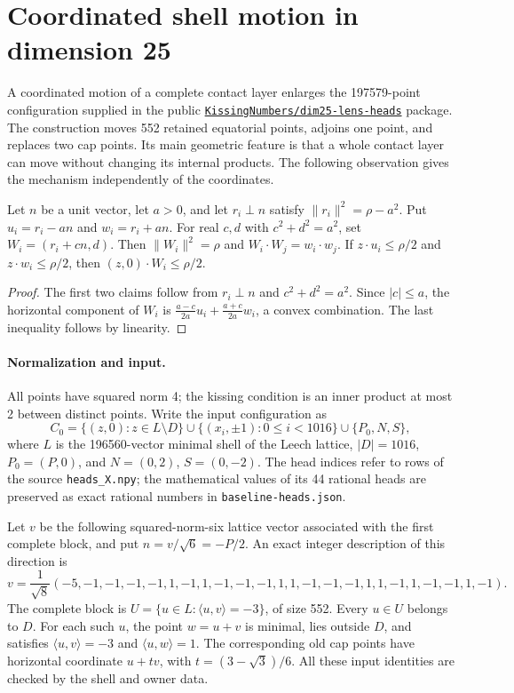 \section{Coordinated shell motion in dimension 25}\label{sec:motion25}
\providecommand{\ip}[2]{\langle #1,#2\rangle}

\noindent
A coordinated motion of a complete contact layer enlarges the 197579-point
configuration supplied in the public
\href{https://github.com/alexlegeartis/KissingNumbers/tree/cf14c5ef4db6059bbf2e570e3f0ce24edfda243e/verifications/improved/dim25-lens-heads}
{\texttt{KissingNumbers/dim25-lens-heads}} package.
The construction moves 552 retained equatorial points, adjoins one point,
and replaces two cap points. Its main geometric feature is that a whole
contact layer can move without changing its internal products. The
following observation gives the mechanism independently of the coordinates.

\begin{lemma}\label{lem:chord-motion}
Let $n$ be a unit vector, let $a>0$, and let $r_i\perp n$ satisfy
$\|r_i\|^2=\rho-a^2$. Put $u_i=r_i-an$ and $w_i=r_i+an$.
For real $c,d$ with $c^2+d^2=a^2$, set $W_i=(r_i+cn,d)$.
Then $\|W_i\|^2=\rho$ and $W_i\cdot W_j=w_i\cdot w_j$.
If $z\cdot u_i\le\rho/2$ and $z\cdot w_i\le\rho/2$, then
$(z,0)\cdot W_i\le\rho/2$.
\end{lemma}
\begin{proof}
The first two claims follow from $r_i\perp n$ and $c^2+d^2=a^2$.
Since $|c|\le a$, the horizontal component of $W_i$ is
$\frac{a-c}{2a}u_i+\frac{a+c}{2a}w_i$, a convex combination.
The last inequality follows by linearity.
\end{proof}

\paragraph{Normalization and input.}
All points have squared norm 4; the kissing condition is an inner product
at most 2 between distinct points. Write the input configuration as
\[
 C_0=\{(z,0):z\in L\setminus D\}
 \cup\{(x_i,\pm1):0\le i<1016\}
 \cup\{P_0,N,S\},
\]
where $L$ is the 196560-vector minimal shell of the Leech lattice,
$|D|=1016$, $P_0=(P,0)$, and $N=(0,2)$, $S=(0,-2)$.
The head indices refer to rows of the source \texttt{heads\_X.npy}; the
mathematical values of its 44 rational heads are preserved as exact
rational numbers in \texttt{baseline-heads.json}.

Let $v$ be the following squared-norm-six lattice vector associated
with the first complete block, and put $n=v/\sqrt6=-P/2$.
An exact integer description of this direction is
\[
v=\frac{1}{\sqrt8}(-5,-1,-1,-1,-1,1,-1,1,-1,-1,-1,1,
1,-1,-1,-1,1,1,-1,1,-1,-1,1,-1).
\]
The complete block is $U=\{u\in L:\ip uv=-3\}$, of size 552.
Every $u\in U$ belongs to $D$. For each such $u$, the point $w=u+v$ is
minimal, lies outside $D$, and satisfies $\ip uv=-3$ and $\ip uw=1$.
The corresponding old cap points have horizontal coordinate
$u+t v$, with $t=(3-\sqrt3)/6$.
All these input identities are checked by the shell and owner data.

